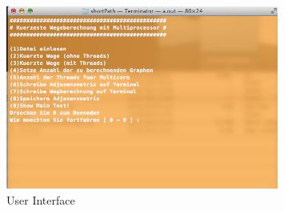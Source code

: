 
\begin{figure}
  \centering
  \includegraphics[width=0.8\textwidth]{./daten/ui_design.png}
  \caption{User Interface}
  \label{ui_design}
\end{figure}
